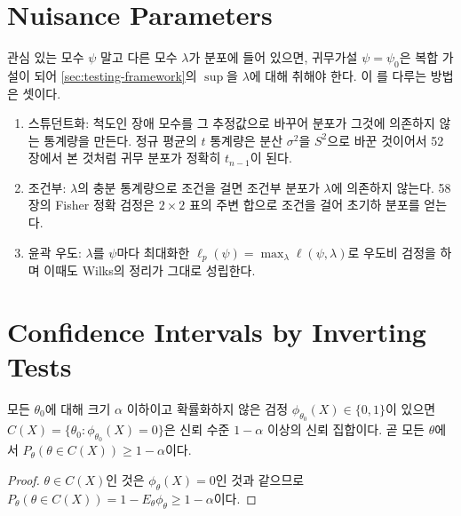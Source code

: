 \section{Nuisance Parameters}
\label{sec:nuisance}

관심 있는 모수 $\psi$ 말고 다른 모수 $\lambda$가 분포에 들어 있으면, 귀무가설 $\psi=\psi_0$은 복합 가설이 되어 \cref{sec:testing-framework}의 $\sup$을 $\lambda$에 대해 취해야 한다. 이 를 다루는 방법은 셋이다.
\begin{enumerate}
\item 스튜던트화: 척도인 장애 모수를 그 추정값으로 바꾸어 분포가 그것에 의존하지 않는 통계량을 만든다. 정규 평균의 $t$ 통계량은 분산 $\sigma^2$을 $S^2$으로 바꾼 것이어서 52장에서 본 것처럼 귀무 분포가 정확히 $t_{n-1}$이 된다.
\item 조건부: $\lambda$의 충분 통계량으로 조건을 걸면 조건부 분포가 $\lambda$에 의존하지 않는다. 58장의 Fisher 정확 검정은 $2\times2$ 표의 주변 합으로 조건을 걸어 초기하 분포를 얻는다.
\item 윤곽 우도: $\lambda$를 $\psi$마다 최대화한 $\ell_p(\psi)=\max_\lambda\ell(\psi,\lambda)$로 우도비 검정을 하며 이때도 Wilks의 정리가 그대로 성립한다.
\end{enumerate}

\section{Confidence Intervals by Inverting Tests}
\label{sec:test-inversion}

\begin{proposition}
\label{prop:test-inversion}
모든 $\theta_0$에 대해 크기 $\alpha$ 이하이고 확률화하지 않은 검정 $\phi_{\theta_0}(X)\in\{0,1\}$이 있으면 $C(X)=\{\theta_0:\phi_{\theta_0}(X)=0\}$은 신뢰 수준 $1-\alpha$ 이상의 신뢰 집합이다. 곧 모든 $\theta$에서 $P_\theta(\theta\in C(X))\ge1-\alpha$이다.
\end{proposition}

\begin{proof}
$\theta\in C(X)$인 것은 $\phi_\theta(X)=0$인 것과 같으므로 $P_\theta(\theta\in C(X))=1-E_\theta\phi_\theta\ge1-\alpha$이다.
\end{proof}

